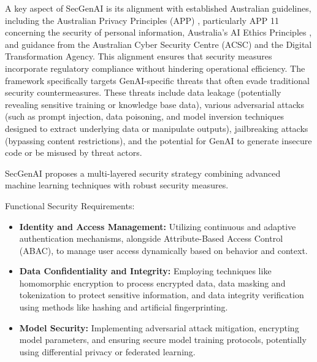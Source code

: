 A key aspect of SecGenAI is its alignment with established Australian guidelines, including the Australian Privacy Principles (APP) \cite{resources_australias_2024}, particularly APP 11 concerning the security of personal information, Australia's AI Ethics Principles \cite{resources_australias_2024}, and guidance from the Australian Cyber Security Centre (ACSC) and the Digital Transformation Agency\cite{haryanto_secgenai_2024}. This alignment ensures that security measures incorporate regulatory compliance without hindering operational efficiency\cite{haryanto_secgenai_2024}. The framework specifically targets GenAI-specific threats that often evade traditional security countermeasures. These threats include data leakage (potentially revealing sensitive training or knowledge base data), various adversarial attacks (such as prompt injection, data poisoning, and model inversion techniques designed to extract underlying data or manipulate outputs), jailbreaking attacks (bypassing content restrictions), and the potential for GenAI to generate insecure code or be misused by threat actors\cite{haryanto_secgenai_2024}.

SecGenAI proposes a multi-layered security strategy combining advanced machine learning techniques with robust security measures.

Functional Security Requirements:
\begin{itemize}
    \item \textbf{Identity and Access Management:} Utilizing continuous and adaptive authentication mechanisms, alongside Attribute-Based Access Control (ABAC), to manage user access dynamically based on behavior and context\cite{haryanto_secgenai_2024}.
    \item \textbf{Data Confidentiality and Integrity:} Employing techniques like homomorphic encryption to process encrypted data, data masking and tokenization to protect sensitive information, and data integrity verification using methods like hashing and artificial fingerprinting\cite{haryanto_secgenai_2024}.
    \item \textbf{Model Security:} Implementing adversarial attack mitigation, encrypting model parameters, and ensuring secure model training protocols, potentially using differential privacy or federated learning\cite{haryanto_secgenai_2024}.
\end{itemize}

